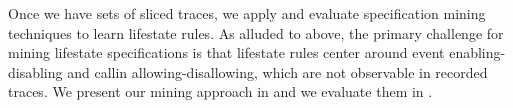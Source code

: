 \documentclass[10pt,reprint,nocopyrightspace,numbers]{sigplanconf}
\begin{document}



Once we have sets of sliced traces, we apply and evaluate specification mining
techniques to learn lifestate rules.
As alluded to above, the
primary challenge for mining lifestate specifications is that
lifestate rules center around event enabling-disabling and callin
allowing-disallowing, which are not observable in recorded traces.
We present our mining approach in  and we evaluate
them in .


\end{document}
